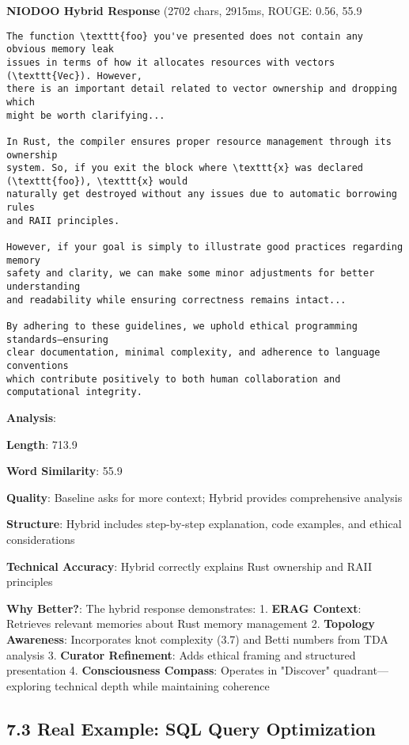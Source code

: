 \documentclass[11pt,a4paper]{article}
\begin{document}
\textbf{NIODOO Hybrid Response} (2702 chars, 2915ms, ROUGE: 0.56, 55.9%
\begin{verbatim}The function \texttt{foo} you've presented does not contain any obvious memory leak 
issues in terms of how it allocates resources with vectors (\texttt{Vec}). However, 
there is an important detail related to vector ownership and dropping which 
might be worth clarifying...

In Rust, the compiler ensures proper resource management through its ownership 
system. So, if you exit the block where \texttt{x} was declared (\texttt{foo}), \texttt{x} would 
naturally get destroyed without any issues due to automatic borrowing rules 
and RAII principles.

However, if your goal is simply to illustrate good practices regarding memory 
safety and clarity, we can make some minor adjustments for better understanding 
and readability while ensuring correctness remains intact...

By adhering to these guidelines, we uphold ethical programming standards—ensuring 
clear documentation, minimal complexity, and adherence to language conventions 
which contribute positively to both human collaboration and computational integrity.
\end{verbatim}

\textbf{Analysis}:
\item \textbf{Length}: 713.9%
\item \textbf{Word Similarity}: 55.9%
\item \textbf{Quality}: Baseline asks for more context; Hybrid provides comprehensive analysis
\item \textbf{Structure}: Hybrid includes step-by-step explanation, code examples, and ethical considerations
\item \textbf{Technical Accuracy}: Hybrid correctly explains Rust ownership and RAII principles

\textbf{Why Better?}: The hybrid response demonstrates:
1. \textbf{ERAG Context}: Retrieves relevant memories about Rust memory management
2. \textbf{Topology Awareness}: Incorporates knot complexity (3.7) and Betti numbers from TDA analysis
3. \textbf{Curator Refinement}: Adds ethical framing and structured presentation
4. \textbf{Consciousness Compass}: Operates in "Discover" quadrant—exploring technical depth while maintaining coherence

\subsection{7.3 Real Example: SQL Query Optimization}
\end{document}

